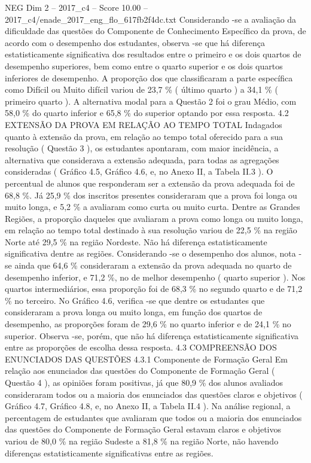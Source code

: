 \begin{textsample}{NEG Dim 2 – 2017\_c4 – Score 10.00 – 2017\_c4/enade\_2017\_eng\_flo\_617fb2f4dc.txt}
Considerando -se a avaliação da dificuldade das questões do Componente de Conhecimento Específico da prova, de acordo com o desempenho dos estudantes, observa -se que há diferença estatisticamente significativa dos resultados entre o primeiro e os dois quartos de desempenho superiores, bem como entre o quarto superior e os dois quartos inferiores de desempenho.
A proporção dos que classificaram a parte específica como Difícil ou Muito difícil variou de 23,7 \% ( último quarto ) a 34,1 \% ( primeiro quarto ).
A alternativa modal para a Questão 2 foi o grau Médio, com 58,0 \% do quarto inferior e 65,8 \% do superior optando por essa resposta. 4.2 EXTENSÃO DA PROVA EM RELAÇÃO AO TEMPO TOTAL Indagados quanto à extensão da prova, em relação ao tempo total oferecido para a sua resolução ( Questão 3 ), os estudantes apontaram, com maior incidência, a alternativa que considerava a extensão adequada, para todas as agregações consideradas ( Gráfico 4.5, Gráfico 4.6, e, no Anexo II, a Tabela II.3 ).
O percentual de alunos que responderam ser a extensão da prova adequada foi de 68,8 \%.
Já 25,9 \% dos inscritos presentes consideraram que a prova foi longa ou muito longa, e 5,2 \% a avaliaram como curta ou muito curta.
Dentre as Grandes Regiões, a proporção daqueles que avaliaram a prova como longa ou muito longa, em relação ao tempo total destinado à sua resolução variou de 22,5 \% na região Norte até 29,5 \% na região Nordeste.
Não há diferença estatisticamente significativa dentre as regiões.
Considerando -se o desempenho dos alunos, nota -se ainda que 64,6 \% consideraram a extensão da prova adequada no quarto de desempenho inferior, e 71,2 \%, no de melhor desempenho ( quarto superior ).
Nos quartos intermediários, essa proporção foi de 68,3 \% no segundo quarto e de 71,2 \% no terceiro.
No Gráfico 4.6, verifica -se que dentre os estudantes que consideraram a prova longa ou muito longa, em função dos quartos de desempenho, as proporções foram de 29,6 \% no quarto inferior e de 24,1 \% no superior.
Observa -se, porém, que não há diferença estatisticamente significativa entre as proporções de escolha dessa resposta. 4.3 COMPREENSÃO DOS ENUNCIADOS DAS QUESTÕES 4.3.1 Componente de Formação Geral Em relação aos enunciados das questões do Componente de Formação Geral ( Questão 4 ), as opiniões foram positivas, já que 80,9 \% dos alunos avaliados consideraram todos ou a maioria dos enunciados das questões claros e objetivos ( Gráfico 4.7, Gráfico 4.8, e, no Anexo II, a Tabela II.4 ).
Na análise regional, a percentagem de estudantes que avaliaram que todos ou a maioria dos enunciados das questões do Componente de Formação Geral estavam claros e objetivos variou de 80,0 \% na região Sudeste a 81,8 \% na região Norte, não havendo diferenças estatisticamente significativas entre as regiões.

\end{textsample}
